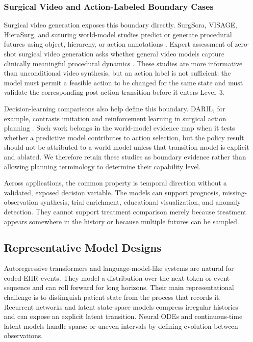 \subsubsection{Surgical Video and Action-Labeled Boundary Cases}

Surgical video generation exposes this boundary directly. SurgSora, VISAGE, HieraSurg, and suturing world-model studies predict or generate procedural futures using object, hierarchy, or action annotations \citep{Chen2024SurgsoraObjectAware,Yeganeh2024VisageVideoSynthesis,Biagini2025HierasurgHierarchyAware,Turkcan2025SuturingWorldModels}. Expert assessment of zero-shot surgical video generation asks whether general video models capture clinically meaningful procedural dynamics \citep{Chen2025HowFarAre}. These studies are more informative than unconditional video synthesis, but an action label is not sufficient: the model must permit a feasible action to be changed for the same state and must validate the corresponding post-action transition before it enters Level~3.

Decision-learning comparisons also help define this boundary. DARIL, for example, contrasts imitation and reinforcement learning in surgical action planning \citep{Boels2025DarilWhenImitation}. Such work belongs in the world-model evidence map when it tests whether a predictive model contributes to action selection, but the policy result should not be attributed to a world model unless that transition model is explicit and ablated. We therefore retain these studies as boundary evidence rather than allowing planning terminology to determine their capability level.

Across applications, the common property is temporal direction without a validated, exposed decision variable. The models can support prognosis, missing-observation synthesis, trial enrichment, educational visualization, and anomaly detection. They cannot support treatment comparison merely because treatment appears somewhere in the history or because multiple futures can be sampled.

\subsection{Representative Model Designs}

Autoregressive transformers and language-model-like systems are natural for coded EHR events. They model a distribution over the next token or event sequence and can roll forward for long horizons. Their main representational challenge is to distinguish patient state from the process that records it. Recurrent networks and latent state-space models compress irregular histories and can expose an explicit latent transition. Neural ODEs and continuous-time latent models handle sparse or uneven intervals by defining evolution between observations.

